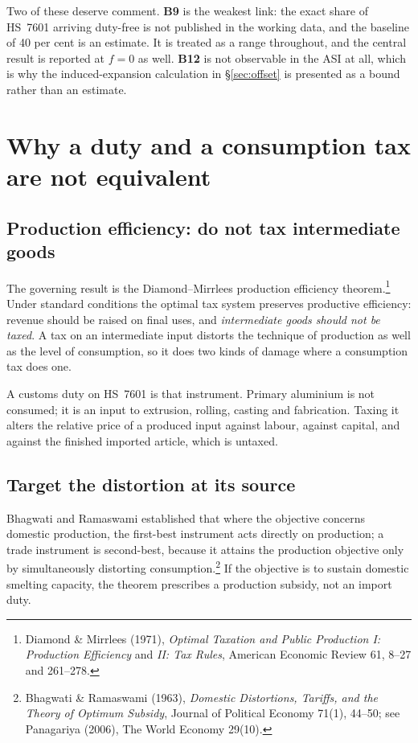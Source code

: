 \documentclass[11pt, a4paper]{article}
\begin{document}
\noindent Two of these deserve comment. \textbf{B9} is the weakest link: the exact
share of HS~7601 arriving duty-free is not published in the working data, and the
baseline of 40 per cent is an estimate. It is treated as a range throughout, and the
central result is reported at $f = 0$ as well. \textbf{B12} is not observable in the
ASI at all, which is why the induced-expansion calculation in §\ref{sec:offset} is
presented as a bound rather than an estimate.

\section{Why a duty and a consumption tax are not equivalent}

\subsection{Production efficiency: do not tax intermediate goods}

The governing result is the Diamond--Mirrlees production efficiency
theorem.\footnote{Diamond \& Mirrlees (1971), \textit{Optimal Taxation and Public
Production I: Production Efficiency} and \textit{II: Tax Rules}, American Economic
Review 61, 8--27 and 261--278.} Under standard conditions the optimal tax system
preserves productive efficiency: revenue should be raised on final uses, and
\emph{intermediate goods should not be taxed}. A tax on an intermediate input
distorts the technique of production as well as the level of consumption, so it does
two kinds of damage where a consumption tax does one.

A customs duty on HS~7601 is that instrument. Primary aluminium is not consumed; it
is an input to extrusion, rolling, casting and fabrication. Taxing it alters the
relative price of a produced input against labour, against capital, and against the
finished imported article, which is untaxed.

\subsection{Target the distortion at its source}

Bhagwati and Ramaswami established that where the objective concerns domestic
production, the first-best instrument acts directly on production; a trade instrument
is second-best, because it attains the production objective only by simultaneously
distorting consumption.\footnote{Bhagwati \& Ramaswami (1963), \textit{Domestic
Distortions, Tariffs, and the Theory of Optimum Subsidy}, Journal of Political
Economy 71(1), 44--50; see Panagariya (2006), The World Economy 29(10).} If the
objective is to sustain domestic smelting capacity, the theorem prescribes a
production subsidy, not an import duty.
\end{document}

